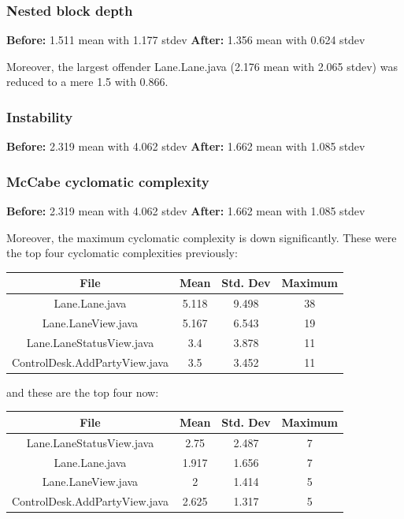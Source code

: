 \subsubsection{Nested block depth}
\textbf{Before:} 1.511 mean with 1.177 stdev
\textbf{After:} 1.356 mean with 0.624 stdev

Moreover, the largest offender Lane.Lane.java (2.176 mean with 2.065 stdev) was reduced to a mere 1.5 with 0.866.

\subsubsection{Instability}

\textbf{Before:} 2.319 mean with 4.062 stdev
\textbf{After:} 1.662 mean with 1.085 stdev


\subsubsection{McCabe cyclomatic complexity}

\textbf{Before:} 2.319 mean with 4.062 stdev
\textbf{After:} 1.662 mean with 1.085 stdev

Moreover, the maximum cyclomatic complexity is down significantly. These were the top four cyclomatic complexities previously:

\begin{tabular}{ |c|c|c|c| }
    \hline
    \textbf{File}       & \textbf{Mean} & \textbf{Std. Dev} & \textbf{Maximum} \\
    \hline
    Lane.Lane.java           & 5.118         & 9.498             & 38               \\
    Lane.LaneView.java       & 5.167         & 6.543             & 19               \\
    Lane.LaneStatusView.java & 3.4           & 3.878             & 11               \\
    ControlDesk.AddPartyView.java   & 3.5           & 3.452             & 11               \\
    \hline
\end{tabular}

and these are the top four now:

\begin{tabular}{ |c|c|c|c| }
    \hline
    \textbf{File}       & \textbf{Mean} & \textbf{Std. Dev} & \textbf{Maximum} \\
    \hline
    Lane.LaneStatusView.java & 2.75          & 2.487             & 7                \\
    Lane.Lane.java           & 1.917         & 1.656             & 7                \\
    Lane.LaneView.java       & 2             & 1.414             & 5                \\
    ControlDesk.AddPartyView.java   & 2.625         & 1.317             & 5                \\
    \hline
\end{tabular}